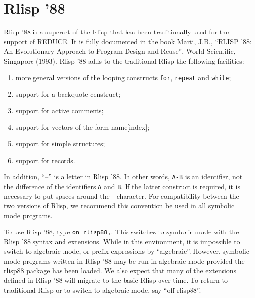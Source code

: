 \section{Rlisp '88}

Rlisp '88 is a superset of the Rlisp that has been traditionally used for
the support of REDUCE.  It is fully documented in the book
Marti, J.B., ``{RLISP} '88:  An Evolutionary Approach to Program Design
and Reuse'', World Scientific, Singapore (1993).
Rlisp '88 adds to the traditional Rlisp the following facilities:
\begin{enumerate}
\item more general versions of the looping constructs {\tt for},
{\tt repeat} and {\tt while};

\item support for a backquote construct;

\item support for active comments;

\item support for vectors of the form name[index];

\item support for simple structures;

\item support for records.
\end{enumerate}

In addition, ``--'' is a letter in Rlisp '88.  In other words, {\tt A-B} is an
identifier, not the difference of the identifiers {\tt A} and {\tt B}.  If
the latter construct is required, it is necessary to put spaces around the
- character.  For compatibility between the two versions of Rlisp, we
recommend this convention be used in all symbolic mode programs.

To use Rlisp '88, type {\tt on rlisp88;}.  This switches to
symbolic mode with the Rlisp '88 syntax and extensions.  While in this
environment, it is impossible to switch to algebraic mode, or prefix
expressions by ``algebraic''.  However, symbolic mode programs written in
Rlisp '88 may be run in algebraic mode provided the rlisp88 package has been
loaded.  We also expect that many of the extensions defined in Rlisp '88
will migrate to the basic Rlisp over time.  To return to traditional Rlisp
or to switch to algebraic mode, say ``off rlisp88''.

